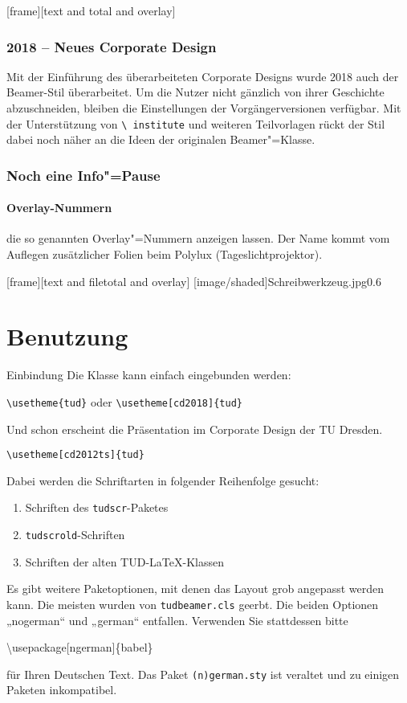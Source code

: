 [frame][text and total and overlay]
\begin{frame}
  \frametitle{2018 – Neues Corporate Design} Mit der Einführung des
  überarbeiteten Corporate Designs wurde 2018 auch der Beamer-Stil
  überarbeitet. Um die Nutzer nicht gänzlich von ihrer Geschichte
  abzuschneiden, bleiben die Einstellungen der Vorgängerversionen
  verfügbar. Mit der Unterstützung von \texttt{\textbackslash
    institute} und weiteren Teilvorlagen rückt der Stil dabei noch
  näher an die Ideen der originalen Beamer"=Klasse.
\end{frame}
\begin{frame}\frametitle{Noch eine Info"=Pause}
  \framesubtitle{Overlay-Nummern}

  die so genannten \alert<6>{Overlay}"=Nummern anzeigen lassen. Der
  Name kommt vom Auflegen zusätzlicher Folien beim Polylux
  (Tageslichtprojektor).
\end{frame}

[frame][text and filetotal and overlay]
[image/shaded]{Schreibwerkzeug.jpg}{0.6}
\section{Benutzung}

\begin{frame}[allowframebreaks]{Einbindung}
  Die Klasse kann einfach eingebunden werden:
  \begin{block}{}
    \texttt{\textbackslash usetheme\{tud\}} oder
    \texttt{\textbackslash usetheme[cd2018]\{tud\}}    
  \end{block}
  Und schon erscheint die Präsentation im Corporate Design der TU Dresden.

  \begin{block}{}
    \texttt{\textbackslash usetheme[cd2012ts]\{tud\}}
  \end{block}
  Dabei werden die Schriftarten in folgender Reihenfolge gesucht:
  \begin{enumerate}
  \item Schriften des \texttt{tudscr}-Paketes
  \item<+-> \texttt{tudscrold}-Schriften
  \item<+-> Schriften der alten TUD-\LaTeX-Klassen
  \end{enumerate}
  \framebreak
  Es gibt weitere Paketoptionen, mit denen das Layout grob angepasst
  werden kann.  Die meisten wurden von \texttt{tudbeamer.cls}
  geerbt. Die beiden Optionen „nogerman“ und „german“
  entfallen. Verwenden Sie stattdessen bitte
  \begin{block}{}
    \textbackslash usepackage[ngerman]\{babel\}
  \end{block}
  für Ihren Deutschen Text. Das Paket \texttt{(n)german.sty} ist
  veraltet und zu einigen Paketen inkompatibel.
\end{frame}

